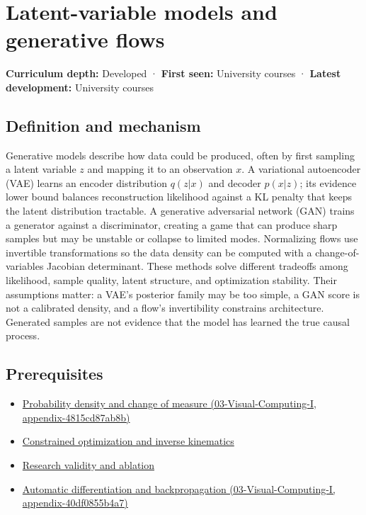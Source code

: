 \hypertarget{appendix-2c568f05ee34}{}
\section{Latent-variable models and generative flows}\label{appendix-2c568f05ee34-latent-variable-models-and-generative-flows}

\textbf{Curriculum depth:} Developed · \textbf{First seen:} University courses · \textbf{Latest development:} University courses

\subsection{Definition and mechanism}\label{appendix-2c568f05ee34-definition-and-mechanism}

Generative models describe how data could be produced, often by first sampling a latent variable \(z\) and mapping it to an observation \(x\). A variational autoencoder (VAE) learns an encoder distribution \(q(z|x)\) and decoder \(p(x|z)\); its evidence lower bound balances reconstruction likelihood against a KL penalty that keeps the latent distribution tractable. A generative adversarial network (GAN) trains a generator against a discriminator, creating a game that can produce sharp samples but may be unstable or collapse to limited modes. Normalizing flows use invertible transformations so the data density can be computed with a change-of-variables Jacobian determinant. These methods solve different tradeoffs among likelihood, sample quality, latent structure, and optimization stability. Their assumptions matter: a VAE's posterior family may be too simple, a GAN score is not a calibrated density, and a flow's invertibility constrains architecture. Generated samples are not evidence that the model has learned the true causal process.

\subsection{Prerequisites}\label{appendix-2c568f05ee34-prerequisites}

\begin{itemize}
\tightlist
\item
  \href{../03-Visual-Computing-I/main.pdf\#nameddest=appendix-4815cd87ab8b}{Probability density and change of measure (03-Visual-Computing-I, appendix-4815cd87ab8b)}
\item
  \hyperref[appendix-29f4bea4c2bb]{Constrained optimization and inverse kinematics}
\item
  \hyperref[appendix-65788587ef78]{Research validity and ablation}
\item
  \href{../03-Visual-Computing-I/main.pdf\#nameddest=appendix-40df0855b4a7}{Automatic differentiation and backpropagation (03-Visual-Computing-I, appendix-40df0855b4a7)}
\end{itemize}

